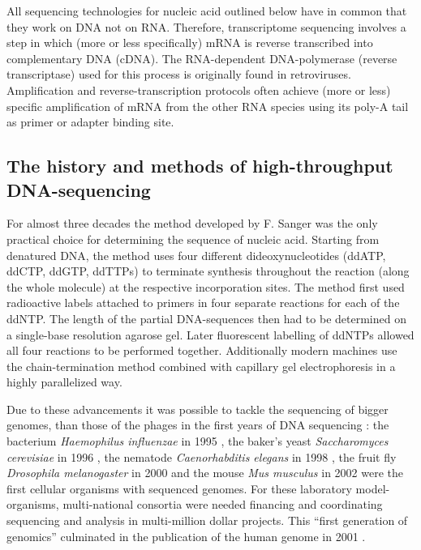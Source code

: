 All sequencing technologies for nucleic acid outlined below have in
common that they work on DNA not on RNA. Therefore, transcriptome
sequencing involves a step in which (more or less specifically) mRNA
is reverse transcribed into complementary DNA (cDNA). The
RNA-dependent DNA-polymerase (reverse transcriptase) used for this
process is originally found in retroviruses. Amplification and
reverse-transcription protocols often achieve (more or less) specific
amplification of mRNA from the other RNA species using its poly-A tail
as primer or adapter binding site.

\subsection{The history and methods of high-throughput DNA-sequencing}
\label{his-seq}

For almost three decades the method developed by F. Sanger
\cite{pmid271968} was the only practical choice for determining the
sequence of nucleic acid. Starting from denatured DNA, the method uses
four different dideoxynucleotides (ddATP, ddCTP, ddGTP, ddTTPs) to
terminate synthesis throughout the reaction (along the whole molecule)
at the respective incorporation sites. The method first used
radioactive labels attached to primers in four separate reactions for
each of the ddNTP. The length of the partial DNA-sequences then had to
be determined on a single-base resolution agarose gel. Later
fluorescent labelling of ddNTPs allowed all four reactions to be
performed together. Additionally modern machines use the
chain-termination method combined with capillary gel electrophoresis
\cite{pmid2326186} in a highly parallelized way.

Due to these advancements it was possible to tackle the sequencing of
bigger genomes, than those of the phages in the first years of DNA
sequencing \cite{pmid1264203}: the bacterium \textit{Haemophilus
  influenzae} in 1995 \cite{pmid7542800}, the baker's yeast
\textit{Saccharomyces cerevisiae} in 1996 \cite{pmid8849441}, the
nematode \textit{Caenorhabditis elegans} in 1998 \cite{pmid9851916},
the fruit fly \textit{Drosophila melanogaster} in 2000
\cite{adams2000genome} and the mouse \textit{Mus musculus} in 2002
\cite{pmid12466850} were the first cellular organisms with sequenced
genomes. For these laboratory model-organisms, multi-national
consortia were needed financing and coordinating sequencing and
analysis in multi-million dollar projects. This ``first generation of
genomics'' culminated in the publication of the human genome in 2001
\cite{pmid11181995}.

